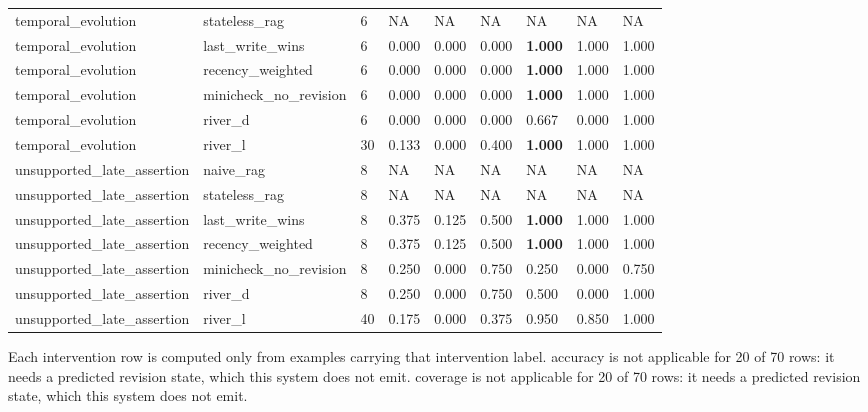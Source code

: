\begin{table}
\begin{tabular}{lllllllll}
temporal\_evolution & stateless\_rag & 6 & NA & NA & NA & NA & NA & NA \\
temporal\_evolution & last\_write\_wins & 6 & 0.000 & 0.000 & 0.000 & \textbf{1.000} & 1.000 & 1.000 \\
temporal\_evolution & recency\_weighted & 6 & 0.000 & 0.000 & 0.000 & \textbf{1.000} & 1.000 & 1.000 \\
temporal\_evolution & minicheck\_no\_revision & 6 & 0.000 & 0.000 & 0.000 & \textbf{1.000} & 1.000 & 1.000 \\
temporal\_evolution & river\_d & 6 & 0.000 & 0.000 & 0.000 & 0.667 & 0.000 & 1.000 \\
temporal\_evolution & river\_l & 30 & 0.133 & 0.000 & 0.400 & \textbf{1.000} & 1.000 & 1.000 \\
unsupported\_late\_assertion & naive\_rag & 8 & NA & NA & NA & NA & NA & NA \\
unsupported\_late\_assertion & stateless\_rag & 8 & NA & NA & NA & NA & NA & NA \\
unsupported\_late\_assertion & last\_write\_wins & 8 & 0.375 & 0.125 & 0.500 & \textbf{1.000} & 1.000 & 1.000 \\
unsupported\_late\_assertion & recency\_weighted & 8 & 0.375 & 0.125 & 0.500 & \textbf{1.000} & 1.000 & 1.000 \\
unsupported\_late\_assertion & minicheck\_no\_revision & 8 & 0.250 & 0.000 & 0.750 & 0.250 & 0.000 & 0.750 \\
unsupported\_late\_assertion & river\_d & 8 & 0.250 & 0.000 & 0.750 & 0.500 & 0.000 & 1.000 \\
unsupported\_late\_assertion & river\_l & 40 & 0.175 & 0.000 & 0.375 & 0.950 & 0.850 & 1.000 \\
\end{tabular}
\footnotesize{Each intervention row is computed only from examples carrying that intervention label.}
\footnotesize{accuracy is not applicable for 20 of 70 rows: it needs a predicted revision state, which this system does not emit.}
\footnotesize{coverage is not applicable for 20 of 70 rows: it needs a predicted revision state, which this system does not emit.}
\end{table}
